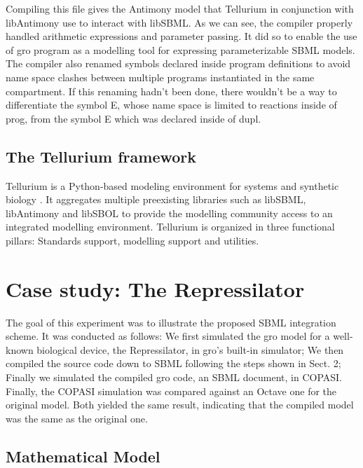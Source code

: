 \documentclass[12pt]{article}
\begin{document}
    
    
    Compiling this file gives the Antimony model that Tellurium in conjunction with libAntimony use to interact with libSBML. As we can see, the compiler properly handled arithmetic expressions and parameter passing. It did so to enable the use of gro program as a modelling tool for expressing parameterizable SBML models. The compiler also renamed symbols declared inside program definitions to avoid name space clashes between multiple programs instantiated in the same compartment. If this renaming hadn't been done, there wouldn't be a way to differentiate the symbol E, whose name space is limited to reactions inside of prog, from the symbol E which was declared inside of dupl.
    
    
    
\subsection{The Tellurium framework}

    Tellurium is a Python-based modeling environment for systems and synthetic biology \cite{Choi2018}. It aggregates multiple preexisting libraries such as libSBML, libAntimony and libSBOL to provide the modelling community access to an integrated modelling environment. Tellurium is organized in three functional pillars: Standards support, modelling support and utilities.


\section{Case study: The Repressilator}


    The goal of this experiment was to illustrate the proposed SBML integration scheme. It was conducted as follows: We first simulated the gro model for a well-known biological device, the Repressilator, in gro's built-in simulator; We then compiled the source code down to SBML following the steps shown in Sect. 2; Finally we simulated the compiled gro code, an SBML document, in COPASI. Finally, the COPASI simulation was compared against an Octave one for the original model. Both yielded the same result, indicating that the compiled model was the same as the original one.


\subsection{Mathematical Model}
\end{document}
